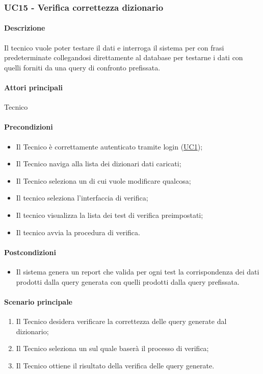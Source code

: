 \subsubsection{UC15 - Verifica correttezza dizionario}\label{UC15}
\paragraph*{Descrizione}
Il tecnico vuole poter testare il  dati e interroga il sistema per con frasi predeterminate collegandosi direttamente al database per testarne i dati con quelli forniti da una query di confronto prefissata.

\paragraph*{Attori principali}
Tecnico

\paragraph*{Precondizioni}
\begin{itemize}
  \item Il Tecnico è correttamente autenticato tramite login (\hyperref[UC1]{UC1});
  \item Il Tecnico naviga alla lista dei dizionari dati caricati;
  \item Il Tecnico seleziona un  di cui vuole modificare qualcosa;
  \item Il tecnico seleziona l’interfaccia di verifica;
  \item Il tecnico visualizza la lista dei test di verifica preimpostati;
  \item Il tecnico avvia la procedura di verifica.
\end{itemize}

\paragraph*{Postcondizioni}
\begin{itemize}
  \item Il sistema genera un report che valida per ogni test la corrispondenza dei dati prodotti dalla query generata con quelli prodotti dalla query prefissata.
\end{itemize}

\paragraph*{Scenario principale}
\begin{enumerate}
  \item Il Tecnico desidera verificare la correttezza delle query generate dal dizionario;
  \item Il Tecnico seleziona un sul quale baserà il processo di verifica;
  \item Il Tecnico ottiene il risultato della verifica delle query generate.
\end{enumerate}

